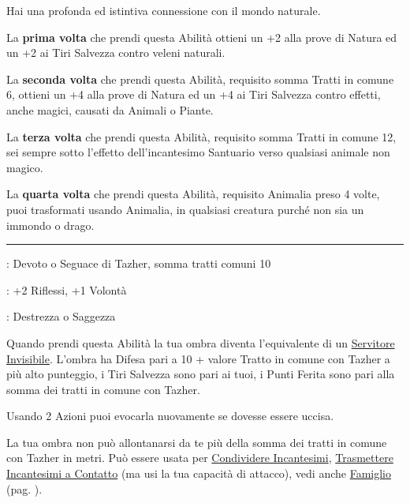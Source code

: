 \begin{multicols}{2}
Hai una profonda ed istintiva connessione con il mondo naturale.

La \textbf{prima volta} che prendi questa Abilità ottieni un +2 alla prove di Natura ed un +2 ai Tiri Salvezza contro veleni naturali.

La \textbf{seconda volta} che prendi questa Abilità, requisito somma Tratti in comune 6, ottieni un +4 alla prove di Natura ed un +4 ai Tiri Salvezza contro effetti, anche magici, causati da Animali o Piante.

La \textbf{terza volta} che prendi questa Abilità, requisito somma Tratti in comune 12, sei sempre sotto l'effetto dell'incantesimo Santuario verso qualsiasi animale non magico.

La \textbf{quarta volta} che prendi questa Abilità, requisito Animalia preso 4 volte, puoi trasformati usando Animalia, in qualsiasi creatura purché non sia un immondo o drago.

\smallskip\noindent\rule{\linewidth}{2pt} \hypertarget{Figlio di Tazher}{}\medskip{}
\noindent
\begin{description}[noitemsep, topsep=0pt, parsep=0pt, partopsep=0pt, leftmargin=0cm, labelwidth=2.5cm]
    \item[\textbf{Requisito}]: Devoto o Seguace di Tazher, somma tratti comuni 10
    \item[\textbf{Tiri Salvezza}]: +2 Riflessi, +1 Volontà
    \item[\textbf{Caratteristica}]: Destrezza o Saggezza
\end{description}

Quando prendi questa Abilità la tua ombra diventa l'equivalente di un \hyperlink{Servitore Invisibile}{Servitore Invisibile}.
L'ombra ha Difesa pari a 10 + valore Tratto in comune con Tazher a più alto punteggio, i Tiri Salvezza sono pari ai tuoi, i Punti Ferita sono pari alla somma dei tratti in comune con Tazher.

Usando 2 Azioni puoi evocarla nuovamente se dovesse essere uccisa.

La tua ombra non può allontanarsi da te più della somma dei tratti in comune con Tazher in metri. Può essere usata per \hyperlink{Condividere Incantesimi}{Condividere Incantesimi}, \hyperlink{Trasmettere Incantesimi a Contatto}{Trasmettere Incantesimi a Contatto} (ma usi la tua capacità di attacco), vedi anche \hyperlink{famiglio}{Famiglio} (pag. \pageref{famiglio}).


\end{multicols}
